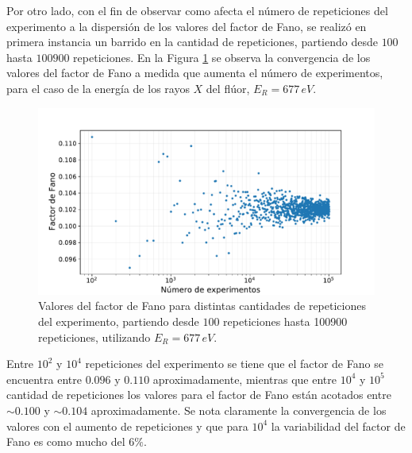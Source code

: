 Por otro lado, con el fin de observar como afecta el número de repeticiones del experimento a la dispersión de los valores del factor de Fano, se realizó en primera instancia un barrido en la cantidad de repeticiones, partiendo desde $100$ hasta $100900$ repeticiones. En la Figura \ref{fig:FanoConvergencia} se observa la convergencia de los valores del factor de Fano a medida que aumenta el número de experimentos, para el caso de la energía de los rayos $X$ del flúor, $E_{R} = 677\,\si{eV}$.
\begin{figure}[h]
    \centering
    \includegraphics[scale=0.5]{Figs/FanoConvergencia.pdf}
    \caption{Valores del factor de Fano para distintas cantidades de repeticiones del experimento, partiendo desde $100$ repeticiones hasta 100900 repeticiones, utilizando $E_{R} = 677\,\si{eV}$.}
    \label{fig:FanoConvergencia}
\end{figure}
Entre $10^{2}$ y $10^{4}$ repeticiones del experimento se tiene que el factor de Fano se encuentra entre $0.096$ y $0.110$ aproximadamente, mientras que entre $10^{4}$ y $10^{5}$ cantidad de repeticiones los valores para el factor de Fano están acotados entre $\sim 0.100$ y $\sim 0.104$ aproximadamente. Se nota claramente la convergencia de los valores con el aumento de repeticiones y que para $10^{4}$ la variabilidad del factor de Fano es como mucho del $6\%$.

